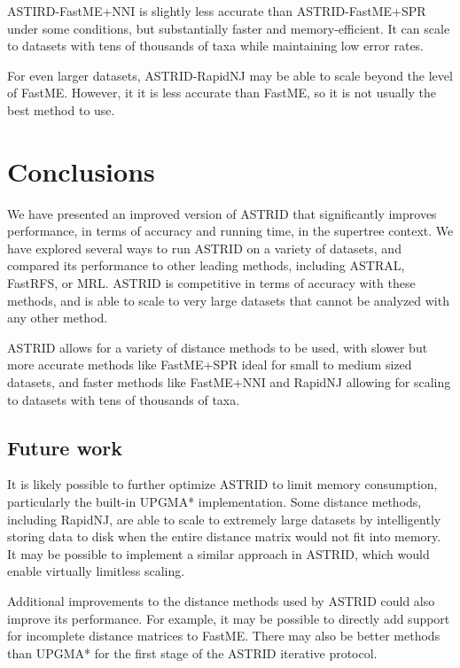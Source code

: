 ASTIRD-FastME+NNI is slightly less accurate than ASTRID-FastME+SPR under some conditions, but substantially faster and memory-efficient. It can scale to datasets with tens of thousands of taxa while maintaining low error rates. 

For even larger datasets, ASTRID-RapidNJ may be able to scale beyond the level of FastME. However, it it is less accurate than FastME, so it is not usually the best method to use.

\section{Conclusions}

We have presented an improved version of ASTRID that significantly improves performance, in terms of accuracy and running time, in the supertree context. We have explored several ways to run ASTRID on a variety of datasets, and compared its performance to other leading methods, including ASTRAL, FastRFS, or MRL. ASTRID is competitive in terms of accuracy with these methods, and is able to scale to very large datasets that cannot be analyzed with any other method. 

ASTRID allows for a variety of distance methods to be used, with slower but more accurate methods like FastME+SPR ideal for small to medium sized datasets, and faster methods like FastME+NNI and RapidNJ allowing for scaling to datasets with tens of thousands of taxa.

\subsection{Future work}

It is likely possible to further optimize ASTRID to limit memory consumption, particularly the built-in UPGMA* implementation. Some distance methods, including RapidNJ, are able to scale to extremely large datasets by intelligently storing data to disk when the entire distance matrix would not fit into memory. It may be possible to implement a similar approach in ASTRID, which would enable virtually limitless scaling.

Additional improvements to the distance methods used by ASTRID could also improve its performance. For example, it may be possible to directly add support for incomplete distance matrices to FastME. There may also be better methods than UPGMA* for the first stage of the ASTRID iterative protocol. 


